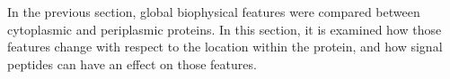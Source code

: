 In the previous section, global biophysical features were compared between cytoplasmic and periplasmic proteins.
In this section, it is examined how those features change with respect to the location within the protein, 
and how signal peptides can have an effect on those features.

